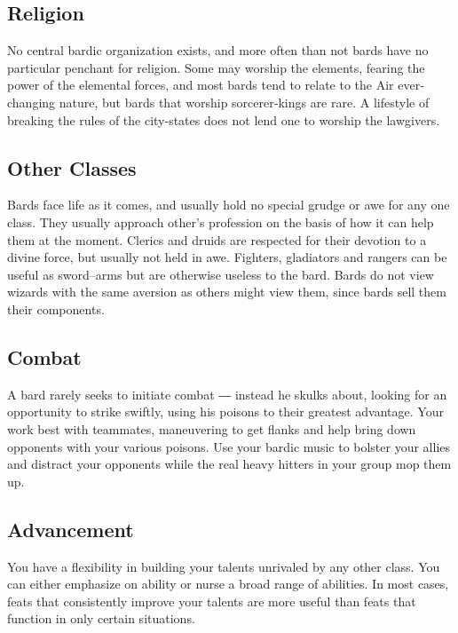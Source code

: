 \documentclass[10pt,a4paper,twocolumn]{d20}
\begin{document}
{\subsection{Religion}

No central bardic organization exists, and more often than not bards have no particular penchant for religion. Some may worship the elements, fearing the power of the elemental forces, and most bards tend to relate to the Air ever‐changing nature, but bards that worship sorcerer‐kings are rare. A lifestyle of breaking the rules of the city‐states does not lend one to worship the lawgivers.

\subsection{Other Classes}

Bards face life as it comes, and usually hold no special grudge or awe for any one class. They usually approach other’s profession on the basis of how it can help them at the moment. Clerics and druids are respected for their devotion to a divine force, but usually not held in awe. Fighters, gladiators and rangers can be useful as sword–arms but are otherwise useless to the bard. Bards do not view wizards with the same aversion as others might view them, since bards sell them their components.

\subsection{Combat}

A bard rarely seeks to initiate combat ― instead he skulks about, looking for an opportunity to strike swiftly, using his poisons to their greatest advantage. Your work best with teammates, maneuvering to get flanks and help bring down opponents with your various poisons. Use your bardic music to bolster your allies and distract your opponents while the real heavy hitters in your group mop them up.

\subsection{Advancement}

You have a flexibility in building your talents unrivaled by any other class. You can either emphasize on ability or nurse a broad range of abilities. In most cases, feats that consistently improve your talents are more useful than feats that function in only certain situations.

}
\end{document}
